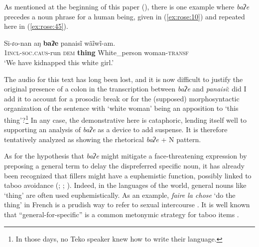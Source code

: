 \documentclass[output=paper]{langscibook}
\begin{document}
As mentioned at the beginning of this paper (), there is one example where \textit{baʔe} precedes a noun phrase for a human being, given in (\ref{ex:rose:10}) and repeated here in (\ref{ex:rose:45}). 


\ea \label{ex:rose:45}
\gll Si-ɾo-nan  aŋ  \textbf{baʔe}  panaisĩ  wãĩwĩ-am.\\
1\textsc{incl}-\textsc{soc}.\textsc{caus}-run  \textsc{dem}  \textbf{thing}  White\_person  woman-\textsc{transf}\\
\glt ‘We have kidnapped this white girl.’ 
\z 

The audio for this text has long been lost, and it is now difficult to justify the original presence of a colon in the transcription between \textit{baʔe} and \textit{panaisĩ}: did I add it to account for a prosodic break or for the (supposed) morphosyntactic organization of the sentence with ‘white woman’ being an apposition to ‘this thing’?\footnote{In those days, no Teko speaker knew how to write their language.} In any case, the demonstrative here is cataphoric, lending itself well to supporting an analysis of \textit{baʔe} as a device to add suspense. It is therefore tentatively analyzed as showing the rhetorical \textit{baʔe} + N pattern.

As for the hypothesis that \textit{baʔe} might mitigate a face-threatening expression by preposing a general term to delay the dispreferred specific noun, it has already been recognized that fillers might have a euphemistic function, possibly linked to taboo avoidance (\citealt{Enfield2003}; \citealt{Cheung2015}; \citealt{Pertejo2015}). Indeed, in the languages of the world, general nouns like ‘thing’ are often used euphemistically. As an example, \textit{faire la chose} ‘do the thing’ in French is a prudish way to refer to sexual intercourse \citep{Kleiber1987}. It is well known that “general-for-specific” is a common metonymic strategy for taboo items \citep{Burridge2006}.
\end{document}
